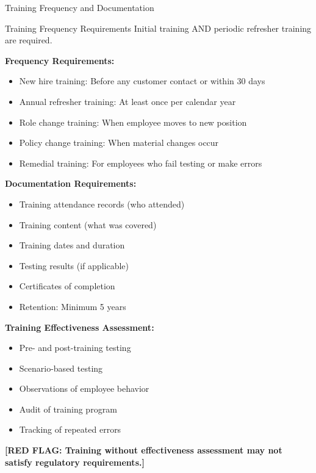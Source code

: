 \documentclass[11pt,a4paper]{beamer}
\newcommand{\redflag}[1]{\textcolor{red!80!black}{\textbf{[RED FLAG: #1]}}}
\begin{document}
	\begin{frame}{Training Frequency and Documentation}
		\begin{block}{Training Frequency Requirements}
			Initial training AND periodic refresher training are required.
		\end{block}
		\textbf{Frequency Requirements:}
		\begin{itemize}
			\item New hire training: Before any customer contact or within 30 days
			\item Annual refresher training: At least once per calendar year
			\item Role change training: When employee moves to new position
			\item Policy change training: When material changes occur
			\item Remedial training: For employees who fail testing or make errors
		\end{itemize}
		\textbf{Documentation Requirements:}
		\begin{itemize}
			\item Training attendance records (who attended)
			\item Training content (what was covered)
			\item Training dates and duration
			\item Testing results (if applicable)
			\item Certificates of completion
			\item Retention: Minimum 5 years
		\end{itemize}
		\textbf{Training Effectiveness Assessment:}
		\begin{itemize}
			\item Pre- and post-training testing
			\item Scenario-based testing
			\item Observations of employee behavior
			\item Audit of training program
			\item Tracking of repeated errors
		\end{itemize}
		\redflag{Training without effectiveness assessment may not satisfy regulatory requirements.}
	\end{frame}
	
	
\end{document}

